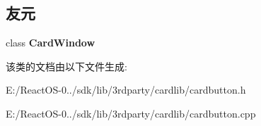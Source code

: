 \subsection*{友元}
\begin{DoxyCompactItemize}
\item 
\mbox{\label{class_card_button_ab011d0f3b2396b3aacec9f12fc70b779}} 
class {\bfseries Card\+Window}
\end{DoxyCompactItemize}


该类的文档由以下文件生成\+:\begin{DoxyCompactItemize}
\item 
E\+:/\+React\+O\+S-\/0../sdk/lib/3rdparty/cardlib/cardbutton.\+h\item 
E\+:/\+React\+O\+S-\/0../sdk/lib/3rdparty/cardlib/cardbutton.\+cpp\end{DoxyCompactItemize}
